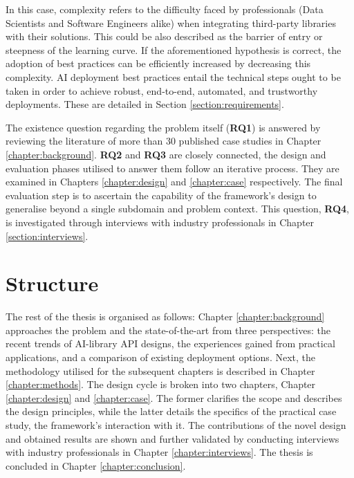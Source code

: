 In this case, complexity refers to the difficulty faced by professionals (Data Scientists and Software Engineers alike) when integrating third-party libraries with their solutions. This could be also described as the barrier of entry or steepness of the learning curve. If the aforementioned hypothesis is correct, the adoption of best practices can be efficiently increased by decreasing this complexity. AI deployment best practices entail the technical steps ought to be taken in order to achieve robust, end-to-end, automated, and trustworthy deployments. These are detailed in Section \ref{section:requirements}.

The existence question regarding the problem itself (\textbf{RQ1}) is answered by reviewing the literature of more than 30 published case studies in Chapter \ref{chapter:background}. \textbf{RQ2} and \textbf{RQ3} are closely connected, the design and evaluation phases utilised to answer them follow an iterative process. They are examined in Chapters \ref{chapter:design} and \ref{chapter:case} respectively. The final evaluation step is to ascertain the capability of the framework's design to generalise beyond a single subdomain and problem context. This question, \textbf{RQ4}, is investigated through interviews with industry professionals in Chapter \ref{section:interviews}.

\section{Structure}

The rest of the thesis is organised as follows: Chapter \ref{chapter:background} approaches the problem and the state-of-the-art from three perspectives: the recent trends of AI-library API designs, the experiences gained from practical applications, and a comparison of existing deployment options. Next, the methodology utilised for the subsequent chapters is described in Chapter \ref{chapter:methods}. The design cycle is broken into two chapters, Chapter \ref{chapter:design} and \ref{chapter:case}. The former clarifies the scope and describes the design principles, while the latter details the specifics of the practical case study, the framework's interaction with it. The contributions of the novel design and obtained results are shown and further validated by conducting interviews with industry professionals in Chapter \ref{chapter:interviews}. The thesis is concluded in Chapter \ref{chapter:conclusion}.
